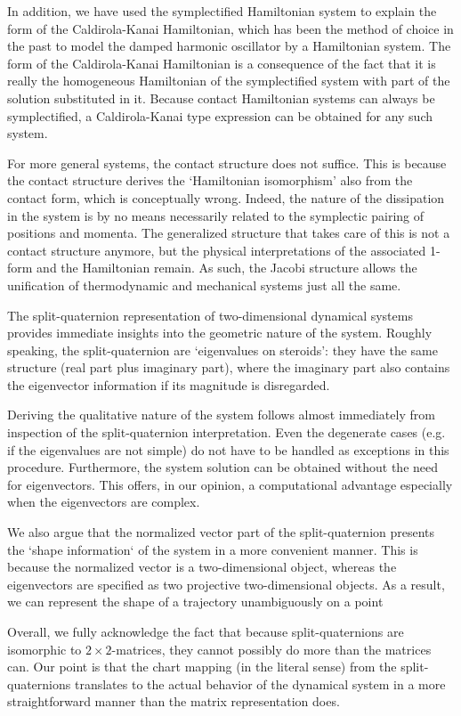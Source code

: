 In addition, we have used the symplectified Hamiltonian system to explain the form of the Caldirola-Kanai Hamiltonian, which has been the method of choice in the past to model the damped harmonic oscillator by a Hamiltonian system. 
The form of the Caldirola-Kanai Hamiltonian is a consequence of the fact that it is really the homogeneous Hamiltonian of the symplectified system with part of the solution substituted in it.
Because contact Hamiltonian systems can always be symplectified, a Caldirola-Kanai type expression can be obtained for any such system.

For more general systems, the contact structure does not suffice. This is because the contact structure derives the `Hamiltonian isomorphism' also from the contact form, which is conceptually wrong. Indeed, the nature of the dissipation in the system is by no means necessarily related to the symplectic pairing of positions and momenta. The generalized structure that takes care of this is not a contact structure anymore, but the physical interpretations of the associated 1-form and the Hamiltonian remain. As such, the Jacobi structure allows the unification of thermodynamic and mechanical systems just all the same.

The split-quaternion representation of two-dimensional dynamical systems provides immediate insights into the geometric nature of the system. Roughly speaking, the split-quaternion are `eigenvalues on steroids': they have the same structure (real part plus imaginary part), where the imaginary part also contains the eigenvector information if its magnitude is disregarded.

Deriving the qualitative nature of the system follows almost immediately from inspection of the split-quaternion interpretation. Even the degenerate cases (e.g. if the eigenvalues are not simple) do not have to be handled as exceptions in this procedure. 
Furthermore, the system solution can be obtained without the need for eigenvectors. This offers, in our opinion, a computational advantage especially when the eigenvectors are complex.

We also argue that the normalized vector part of the split-quaternion presents the `shape information` of the system in a more convenient manner. This is because the normalized vector is a two-dimensional object, whereas the eigenvectors are specified as two projective two-dimensional objects. As a result, we can represent the shape of a trajectory unambiguously on a point

Overall, we fully acknowledge the fact that because split-quaternions are isomorphic to $2\times2$-matrices, they cannot possibly do more than the matrices can. Our point is that the chart mapping (in the literal sense) from the split-quaternions translates to the actual behavior of the dynamical system in a more straightforward manner than the matrix representation does.

